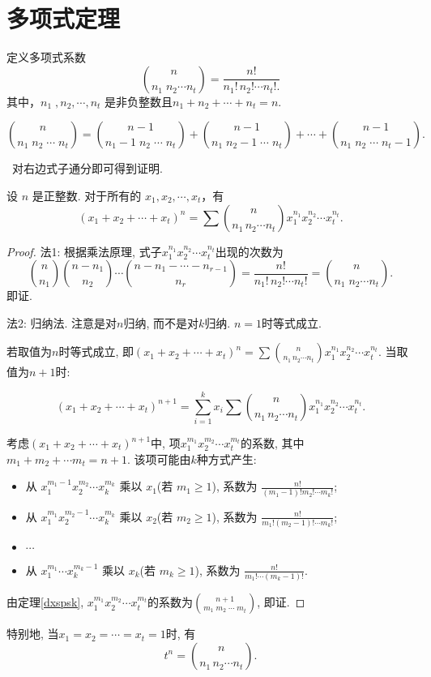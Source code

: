 \section{多项式定理} 
定义多项式系数
\[
\binom{n}{n_1\; n_2 \cdots n_t} = \frac{n!}{n_1! \, n_2! \cdots n_t!.}
\]
其中，\( n_1\;, n_2, \cdots, n_t \) 是非负整数且$n_1 + n_2 + \cdots + n_t = n$.

\begin{theorem}[多项式系数的帕斯卡公式]\label{dxspsk}
    $$\binom{n}{n_1 \; n_2 \; \cdots \; n_t} = \binom{n-1}{n_1-1 \; n_2 \; \cdots \; n_t} + \binom{n-1}{n_1 \; n_2-1 \; \cdots \; n_t} + \cdots + \binom{n-1}{n_1 \; n_2 \; \cdots \; n_t-1}.$$
\end{theorem}\
对右边式子通分即可得到证明.

\begin{theorem}[多项式定理]
    设 \( n \) 是正整数.  对于所有的 \( x_1, x_2, \cdots, x_t \)，有
\[
(x_1 + x_2 + \cdots + x_t)^n = \sum \binom{n}{n_1 \, n_2 \cdots n_t} x_1^{n_1} x_2^{n_2} \cdots x_t^{n_t}.
\]
\end{theorem}
\begin{proof}
    法1: 根据乘法原理, 式子$x_1^{n_1} x_2^{n_2} \cdots x_t^{n_t}$出现的次数为
    $$\binom{n}{n_1} \binom{n-n_1}{n_2} \cdots \binom{n-n_1-\cdots-n_{r-1}}{n_r}=\frac{n!}{n_1! \, n_2! \cdots n_t!}=\binom{n}{n_1\; n_2 \cdots n_t}.$$即证.

    法2: 归纳法. 注意是对$n$归纳, 而不是对$k$归纳. $n=1$时等式成立.

    若取值为$n$时等式成立, 即$(x_1 + x_2 + \cdots + x_t)^n = \sum \binom{n}{n_1 \, n_2 \cdots n_t} x_1^{n_1} x_2^{n_2} \cdots x_t^{n_t}.$ 当取值为$n+1$时:

    $$(x_1 + x_2 + \cdots + x_t)^{n+1} = \sum_{i=1}^{k}x_i  \sum \binom{n}{n_1 \, n_2 \cdots n_t} x_1^{n_1} x_2^{n_2} \cdots x_t^{n_t}.$$

    考虑$(x_1 + x_2 + \cdots + x_t)^{n+1}$中, 项$x_1^{m_1} x_2^{m_2} \cdots x_t^{m_t}$的系数, 其中$m_1+m_2+\cdots m_t=n+1$. 该项可能由$k$种方式产生:

    \begin{itemize}
        \item 从 \( x_1^{m_1 - 1} x_2^{m_2} \cdots x_k^{m_k} \) 乘以 \( x_1 \)(若 \( m_1 \geq 1 \)), 系数为 \( \frac{n!}{(m_1 - 1)! m_2! \cdots m_k!} \);
        \item 从 \( x_1^{m_1} x_2^{m_2 - 1} \cdots x_k^{m_k} \) 乘以 \( x_2 \)(若 \( m_2 \geq 1 \)), 系数为 \( \frac{n!}{m_1! (m_2 - 1)! \cdots m_k!} \);
        \item \(\cdots\)
        \item 从 \( x_1^{m_1} \cdots x_k^{m_k - 1} \) 乘以 \( x_k \)(若 \( m_k \geq 1 \)), 系数为 \( \frac{n!}{m_1! \cdots (m_k - 1)!} \).

    \end{itemize}

    由定理\ref{dxspsk}, $x_1^{m_1} x_2^{m_2} \cdots x_t^{m_t}$的系数为$\binom{n+1}{m_1 \; m_2 \; \cdots \; m_t}$, 即证.

\end{proof} 

特别地, 当$x_1=x_2=\cdots=x_t=1$时, 有
$$t^n=\binom{n}{n_1 \, n_2 \cdots n_t}.$$
